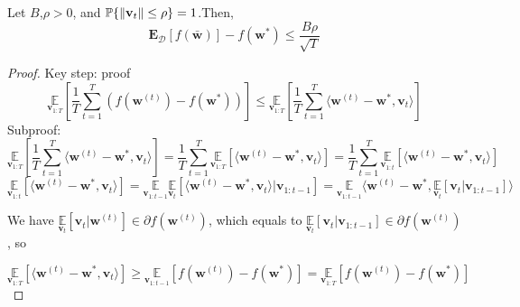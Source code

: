 \begin{thm}
	Let $B$,$\rho > 0$, and $\mathbb{P}\{\Arrowvert\mathbf{v}_t\Arrowvert\le\rho\}=1$.Then,
	\begin{equation}
		\mathbf{E}_\mathcal{D} [f(\bar{\mathbf{w}})] - f(\mathbf{w}^*)
		\le \frac{B\rho}{\sqrt{T}}
	\end{equation}
	\begin{proof}
		Key step: proof 
		\begin{equation}
			 \underset{\mathbf{v}_{1:T}}{\mathbb{E}}
			\left[ \frac{1}{T} \sum\limits^T_{t=1}(f(\mathbf{w}^{(t)})- f(\mathbf{w}^*)) \right] 
			\le \underset{\mathbf{v}_{1:T}}{\mathbb{E}}
			\left[ \frac{1}{T} \sum^T_{t=1} \langle \mathbf{w}^{(t)}-\mathbf{w}^*, \mathbf{v}_t \rangle \right]
		\end{equation}
		Subproof:
		\[ 
			\underset{\mathbf{v}_{1:T}}{\mathbb{E}}
			\left[ \frac{1}{T} \sum^T_{t=1} \langle \mathbf{w}^{(t)}-\mathbf{w}^*, \mathbf{v}_t \rangle \right]
			=  \frac{1}{T} \sum^T_{t=1} \underset{\mathbf{v}_{1:T}}{\mathbb{E}}
			\left[ \langle \mathbf{w}^{(t)}-\mathbf{w}^*, \mathbf{v}_t \rangle \right]
			=  \frac{1}{T} \sum^T_{t=1} \underset{\mathbf{v}_{1:t}}{\mathbb{E}}
			\left[ \langle \mathbf{w}^{(t)}-\mathbf{w}^*, \mathbf{v}_t \rangle \right]
		\]
		\[ 
			\underset{\mathbf{v}_{1:t}}{\mathbb{E}}
			\left[ \langle \mathbf{w}^{(t)}-\mathbf{w}^*, \mathbf{v}_t \rangle \right]
			= 
			\underset{\mathbf{v}_{1:t-1}}{\mathbb{E}}
			\underset{\mathbf{v}_{t}}{\mathbb{E}}
			\left[ \langle \mathbf{w}^{(t)}-\mathbf{w}^*, \mathbf{v}_t \rangle | \mathbf{v}_{1:t-1}\right]
			=
			\underset{\mathbf{v}_{1:t-1}}{\mathbb{E}}
			\langle \mathbf{w}^{(t)}-\mathbf{w}^*,
			\underset{\mathbf{v}_{t}}{\mathbb{E}}
			\left[\mathbf{v}_t | \mathbf{v}_{1:t-1}\right] \rangle
		\]

		We have 
		$ \underset{\mathbf{v}_t}{\mathbb{E}}
		[\mathbf{v}_t | \mathbf{w}^{(t)}] \in \partial f(\mathbf{w}^{(t)})$,
		which equals to
		$ \underset{\mathbf{v}_t}{\mathbb{E}}
		[\mathbf{v}_t | \mathbf{v}_{1:t-1}] \in \partial f(\mathbf{w}^{(t)})$,
		so

		\[ 
			\underset{\mathbf{v}_{1:T}}{\mathbb{E}}
			\left[ \langle \mathbf{w}^{(t)}-\mathbf{w}^*, \mathbf{v}_t \rangle \right]
			\ge
			\underset{\mathbf{v}_{1:t-1}}{\mathbb{E}}
			\left[ f(\mathbf{w}^{(t)}) - f(\mathbf{w}^*) \right]
			=
			\underset{\mathbf{v}_{1:T}}{\mathbb{E}}
			\left[ f(\mathbf{w}^{(t)}) - f(\mathbf{w}^*) \right]
		\]
	\end{proof}
\end{thm}

